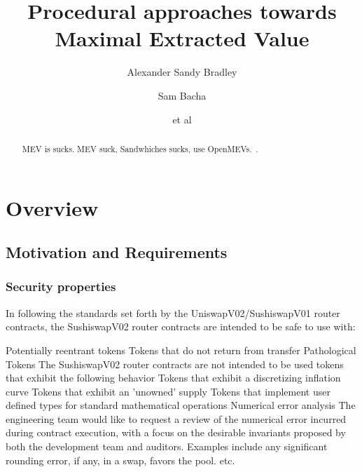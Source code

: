 \documentclass[runningheads]{llncs}
\begin{document}
%
\title{Procedural approaches towards Maximal Extracted Value}
%
\author{Alexander Sandy Bradley \and
Sam Bacha \and
et al}
%
%


%
\maketitle              %


\tableofcontents


\chapter{Overview}
\begin{abstract}
    MEV is sucks. \newline
MEV suck, Sandwhiches sucks, use OpenMEVs.~\cite{openmev}.
\end{abstract}


\section{Motivation and Requirements}

\subsection{Security properties}

In following the standards set forth by the UniswapV02/SushiswapV01 router contracts, the SushiswapV02 router contracts are intended to be safe to use with:

Potentially reentrant tokens
Tokens that do not return from transfer
Pathological Tokens The SushiswapV02 router contracts are not intended to be used tokens that exhibit the following behavior
Tokens that exhibit a discretizing inflation curve
Tokens that exhibit an 'unowned' supply
Tokens that implement user defined types for standard mathematical operations
Numerical error analysis The engineering team would like to request a review of the numerical error incurred during contract execution, with a focus on the desirable invariants proposed by both the development team and auditors. Examples include any significant rounding error, if any, in a swap, favors the pool. etc.
\end{document}
